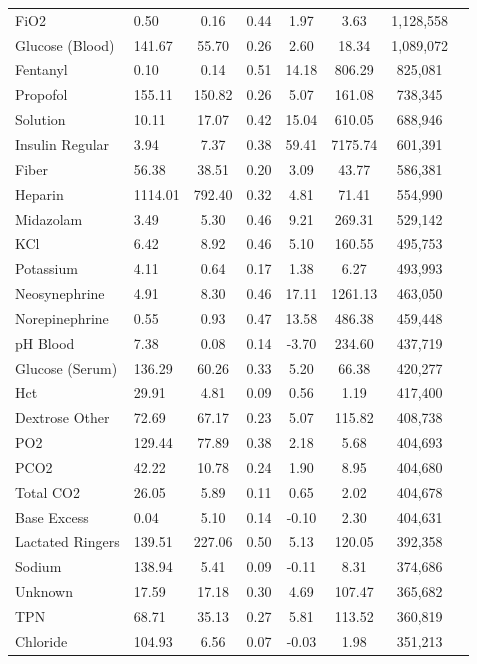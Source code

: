\begin{longtable}{p{3.5cm}lcccccc}
FiO2 & 0.50 & 0.16 & 0.44 & 1.97 & 3.63 & 1,128,558 \\
Glucose (Blood) & 141.67 & 55.70 & 0.26 & 2.60 & 18.34 & 1,089,072 \\
Fentanyl & 0.10 & 0.14 & 0.51 & 14.18 & 806.29 & 825,081 \\
Propofol & 155.11 & 150.82 & 0.26 & 5.07 & 161.08 & 738,345 \\
Solution & 10.11 & 17.07 & 0.42 & 15.04 & 610.05 & 688,946 \\
Insulin Regular & 3.94 & 7.37 & 0.38 & 59.41 & 7175.74 & 601,391 \\
Fiber & 56.38 & 38.51 & 0.20 & 3.09 & 43.77 & 586,381 \\
Heparin & 1114.01 & 792.40 & 0.32 & 4.81 & 71.41 & 554,990 \\
Midazolam & 3.49 & 5.30 & 0.46 & 9.21 & 269.31 & 529,142 \\
KCl & 6.42 & 8.92 & 0.46 & 5.10 & 160.55 & 495,753 \\
Potassium & 4.11 & 0.64 & 0.17 & 1.38 & 6.27 & 493,993 \\
Neosynephrine & 4.91 & 8.30 & 0.46 & 17.11 & 1261.13 & 463,050 \\
Norepinephrine & 0.55 & 0.93 & 0.47 & 13.58 & 486.38 & 459,448 \\
pH Blood & 7.38 & 0.08 & 0.14 & -3.70 & 234.60 & 437,719 \\
Glucose (Serum) & 136.29 & 60.26 & 0.33 & 5.20 & 66.38 & 420,277 \\
Hct & 29.91 & 4.81 & 0.09 & 0.56 & 1.19 & 417,400 \\
Dextrose Other & 72.69 & 67.17 & 0.23 & 5.07 & 115.82 & 408,738 \\
PO2 & 129.44 & 77.89 & 0.38 & 2.18 & 5.68 & 404,693 \\
PCO2 & 42.22 & 10.78 & 0.24 & 1.90 & 8.95 & 404,680 \\
Total CO2 & 26.05 & 5.89 & 0.11 & 0.65 & 2.02 & 404,678 \\
Base Excess & 0.04 & 5.10 & 0.14 & -0.10 & 2.30 & 404,631 \\
Lactated Ringers & 139.51 & 227.06 & 0.50 & 5.13 & 120.05 & 392,358 \\
Sodium & 138.94 & 5.41 & 0.09 & -0.11 & 8.31 & 374,686 \\
Unknown & 17.59 & 17.18 & 0.30 & 4.69 & 107.47 & 365,682 \\
TPN & 68.71 & 35.13 & 0.27 & 5.81 & 113.52 & 360,819 \\
Chloride & 104.93 & 6.56 & 0.07 & -0.03 & 1.98 & 351,213 \\

\end{longtable}
